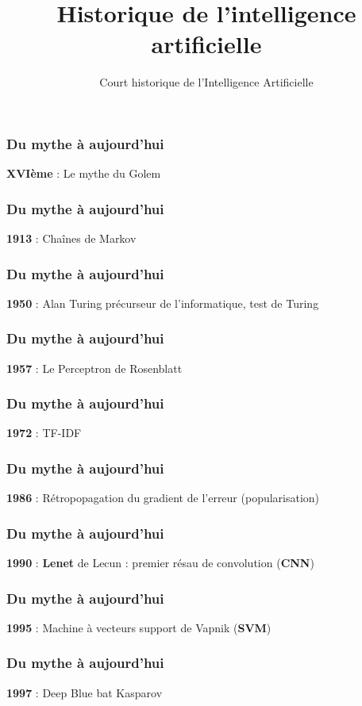 \documentclass{formation}
\title{Historique de l'intelligence artificielle}
\subtitle{Court historique de l'Intelligence Artificielle}
\begin{document}
\maketitle

\begin{frame}
  \frametitle{Du mythe à aujourd'hui}
  \textbf{XVIème} : Le mythe du Golem
\end{frame}

\begin{frame}
  \frametitle{Du mythe à aujourd'hui}
  \textbf{1913} : Chaînes de Markov
\end{frame}

\begin{frame}
  \frametitle{Du mythe à aujourd'hui}
  \textbf{1950} : Alan Turing
  précurseur de l'informatique, test de Turing
\end{frame}

\begin{frame}
  \frametitle{Du mythe à aujourd'hui}
  \textbf{1957} : Le Perceptron de Rosenblatt
\end{frame}

\begin{frame}
  \frametitle{Du mythe à aujourd'hui}
  \textbf{1972} :  TF-IDF
\end{frame}

\begin{frame}
  \frametitle{Du mythe à aujourd'hui}
  \textbf{1986} : Rétropopagation du gradient de l'erreur (popularisation)
\end{frame}

\begin{frame}
  \frametitle{Du mythe à aujourd'hui}
  \textbf{1990} : \textbf{Lenet} de Lecun : premier résau de convolution (\textbf{CNN})
\end{frame}

\begin{frame}
  \frametitle{Du mythe à aujourd'hui}
  \textbf{1995} : Machine à vecteurs support de Vapnik (\textbf{SVM})
\end{frame}

\begin{frame}
  \frametitle{Du mythe à aujourd'hui}
  \textbf{1997} : Deep Blue bat Kasparov
\end{frame}
\end{document}
